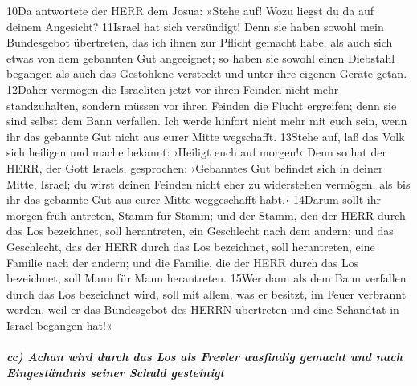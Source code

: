 10Da antwortete der HERR dem Josua: »Stehe auf! Wozu liegst du da auf
deinem Angesicht? 11Israel hat sich versündigt! Denn sie haben sowohl
mein Bundesgebot übertreten, das ich ihnen zur Pflicht gemacht habe, als
auch sich etwas von dem gebannten Gut angeeignet; so haben sie sowohl
einen Diebstahl begangen als auch das Gestohlene versteckt und unter
ihre eigenen Geräte getan. 12Daher vermögen die Israeliten jetzt vor
ihren Feinden nicht mehr standzuhalten, sondern müssen vor ihren Feinden
die Flucht ergreifen; denn sie sind selbst dem Bann verfallen. Ich werde
hinfort nicht mehr mit euch sein, wenn ihr das gebannte Gut nicht aus
eurer Mitte wegschafft. 13Stehe auf, laß das Volk sich heiligen und
mache bekannt: ›Heiligt euch auf morgen!‹ Denn so hat der HERR, der Gott
Israels, gesprochen: ›Gebanntes Gut befindet sich in deiner Mitte,
Israel; du wirst deinen Feinden nicht eher zu widerstehen vermögen, als
bis ihr das gebannte Gut aus eurer Mitte weggeschafft habt.‹ 14Darum
sollt ihr morgen früh antreten, Stamm für Stamm; und der Stamm, den der
HERR durch das Los bezeichnet, soll herantreten, ein Geschlecht nach dem
andern; und das Geschlecht, das der HERR durch das Los bezeichnet, soll
herantreten, eine Familie nach der andern; und die Familie, die der HERR
durch das Los bezeichnet, soll Mann für Mann herantreten. 15Wer dann als
dem Bann verfallen durch das Los bezeichnet wird, soll mit allem, was er
besitzt, im Feuer verbrannt werden, weil er das Bundesgebot des HERRN
übertreten und eine Schandtat in Israel begangen hat!«

\hypertarget{cc-achan-wird-durch-das-los-als-frevler-ausfindig-gemacht-und-nach-eingestuxe4ndnis-seiner-schuld-gesteinigt}{%
\subparagraph{cc) Achan wird durch das Los als Frevler ausfindig gemacht
und nach Eingeständnis seiner Schuld
gesteinigt}\label{cc-achan-wird-durch-das-los-als-frevler-ausfindig-gemacht-und-nach-eingestuxe4ndnis-seiner-schuld-gesteinigt}}

